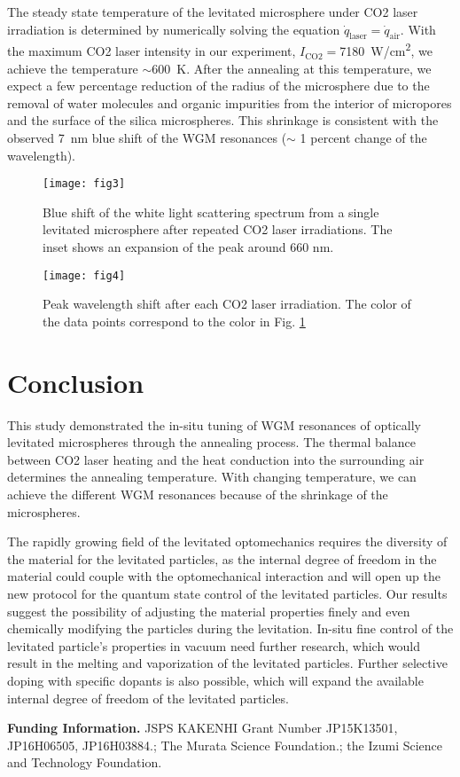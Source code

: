\documentclass[aps,prl,preprint,groupedaddress]{revtex4-1}
\begin{document}
The steady state temperature of the levitated microsphere under CO2 laser irradiation is determined by numerically solving the equation $\dot{q}_\mathrm{laser}=\dot{q}_\mathrm{air}$. With the maximum CO2 laser intensity in our experiment, $I_\mathrm{CO2}=$\SI{7180}{W/cm^2}, we achieve the temperature $\sim$\SI{600}{K}. After the annealing at this temperature, we expect a few percentage reduction of the radius of the microsphere due to the removal of water molecules and organic impurities from the interior of micropores and the surface of the silica microspheres\cite{cho_stabilization_2014}. This shrinkage is consistent with the observed \SI{7}{nm} blue shift of the WGM resonances ($\sim$ 1 percent change of the wavelength).




\begin{figure}[htbp]
\centering
\texttt{[image: fig3]}
\caption{Blue shift of the white light scattering spectrum from a single levitated microsphere after repeated CO2 laser irradiations. The inset shows an expansion of the peak around 660 nm.}
\label{fig:tuning}
\end{figure}

\begin{figure}[htbp]
\centering
\texttt{[image: fig4]}
\caption{Peak wavelength shift after each CO2 laser irradiation. The color of the data points correspond to the color in Fig. \ref{fig:tuning}}
\label{fig:peakshift}
\end{figure}



\section{Conclusion}
This study demonstrated the in-situ tuning of WGM resonances of optically levitated microspheres through the annealing process. The thermal balance between CO2 laser heating and the heat conduction into the surrounding air determines the annealing temperature. With changing temperature, we can achieve the different WGM resonances because of the shrinkage of the microspheres.  

The rapidly growing field of the levitated optomechanics requires the diversity of the material for the levitated particles\cite{neukirch_multi-dimensional_2015,rahman_burning_2016,juan_near-field_2016}, as the internal degree of freedom in the material could couple with the optomechanical interaction and will open up the new protocol for the quantum state control of the levitated particles\cite{yin_large_2013}. Our results suggest the possibility of adjusting the material properties finely and even chemically modifying the particles during the levitation. In-situ fine control of the levitated particle's properties in vacuum need further research, which would result in the melting and vaporization of the levitated particles. Further selective doping with specific dopants is also possible, which will expand the available internal degree of freedom of the levitated particles.   



\textbf{Funding Information.} JSPS KAKENHI Grant Number JP15K13501, JP16H06505, JP16H03884.; The Murata Science Foundation.; the Izumi Science and Technology Foundation.




\end{document}
